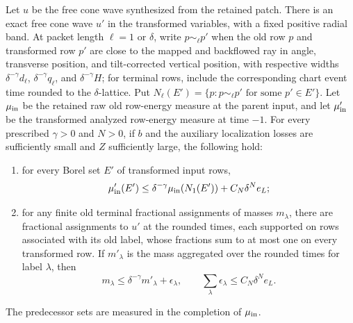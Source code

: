 \begin{lemma}\label{rt:wave-transport}
Let $u$ be the free cone wave synthesized from the retained patch.
There is an exact free cone wave $u'$ in the transformed variables,
with a fixed positive radial band. At packet length $\ell=1$ or $\delta$,
write $p\sim_\ell p'$ when the old row $p$ and transformed row $p'$
are close to the mapped and backflowed ray in angle, transverse position,
and tilt-corrected vertical position, with respective widths
$\delta^{-\gamma}d_\ell$, $\delta^{-\gamma}q_\ell$, and
$\delta^{-\gamma}H$; for terminal rows, include the corresponding chart
event time rounded to the $\delta$-lattice. Put
$N_\ell(E')=\{p:p\sim_\ell p'\text{ for some }p'\in E'\}$.
Let $\mu_{\rm in}$ be the retained raw old row-energy measure at the
parent input, and let $\mu'_{\rm in}$ be the transformed analyzed
row-energy measure at time $-1$. For every prescribed $\gamma>0$ and
$N>0$, if $b$ and the auxiliary localization losses are sufficiently
small and $Z$ sufficiently large, the following hold:
\begin{enumerate}[label=\textup{(\roman*)}]
\item for every Borel set $E'$ of transformed input rows,
\[
 \mu'_{\rm in}(E')\le
 \delta^{-\gamma}\mu_{\rm in}(N_1(E'))+C_N\delta^N e_L;
\]
\item for any finite old terminal fractional assignments of masses
$m_\lambda$, there are fractional assignments to $u'$ at the rounded
times, each supported on rows associated with its old label, whose
fractions sum to at most one on every transformed row. If $m'_\lambda$
is the mass aggregated over the rounded times for label $\lambda$,
then
\[
 m_\lambda\le\delta^{-\gamma}m'_\lambda+\epsilon_\lambda,
 \qquad \sum_\lambda\epsilon_\lambda\le C_N\delta^N e_L.
\]
\end{enumerate}
The predecessor sets are measured in the completion of $\mu_{\rm in}$.
\end{lemma}

